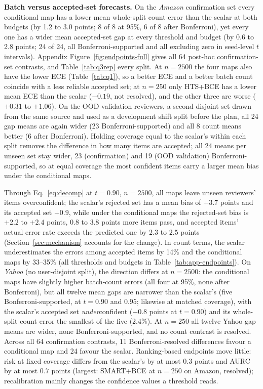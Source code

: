 \documentclass[sigconf,anonymous,review]{acmart}
\begin{document}
\textbf{Batch versus accepted-set forecasts.} On the \emph{Amazon} confirmation set every
conditional map has a lower mean whole-split count error than the scalar at
both budgets (by 1.2 to 3.0 points; 8 of 8 at 95\%, 6 of 8 after
Bonferroni), yet every one has a wider mean accepted-set gap at every
threshold and budget (by 0.6 to 2.8 points; 24 of 24, all
Bonferroni-supported and all excluding zero in seed-level $t$ intervals).
Appendix Figure~\ref{fig:endpoints-full} gives all 64 post-hoc
confirmation-set contrasts, and Table~\ref{tab:q3rep} every split.
At $n{=}2500$ the four maps also have the lower ECE (Table~\ref{tab:q1}),
so a better ECE and a better batch count coincide with a less reliable
accepted set; at $n{=}250$ only HTS+BCE has a lower mean ECE than the
scalar ($-0.19$, not resolved), and the other three are worse ($+0.31$ to
$+1.06$). On the OOD validation reviewers, a second disjoint set drawn from the
same source and used as a development shift split before the plan, all 24 gap means are again wider (23
Bonferroni-supported) and all 8 count means better (6 after Bonferroni).
Holding coverage equal to the scalar's within each split removes the
difference in how many items are accepted; all 24 means per unseen set stay
wider, 23 (confirmation) and 19 (OOD validation) Bonferroni-supported, so at
equal coverage the most confident items carry a larger mean bias under the
conditional maps.

Through Eq.~\eqref{eq:decomp} at $t{=}0.90$, $n{=}2500$, all maps leave unseen reviewers' items overconfident; the
scalar's rejected set has a mean bias of $+3.7$ points and its accepted
set $+0.9$, while under the conditional maps the rejected-set bias is
$+2.2$ to $+2.4$ points, 0.8 to 3.8 points more items pass, and accepted
items' actual error rate exceeds the predicted one by $2.3$ to $2.5$
points (Section~\ref{sec:mechanism} accounts for the change). In
count terms, the scalar underestimates the errors among accepted items by
14\% and the conditional maps by 33--35\% (all thresholds and budgets in
Table~\ref{tab:app-endpoints}). On \emph{Yahoo} (no user-disjoint split),
the direction differs at $n{=}2500$: the conditional maps have slightly
higher batch-count errors (all four at 95\%, none after Bonferroni), but all
twelve mean gaps are narrower than the scalar's (five Bonferroni-supported,
at $t{=}0.90$ and $0.95$; likewise at matched coverage), with the scalar's
accepted set \emph{under}confident ($-0.8$ points at $t{=}0.90$) and its
whole-split count error the smallest of the five (2.4\%). At $n{=}250$ all
twelve Yahoo gap means are wider, none Bonferroni-supported, and no count
contrast is resolved. Across all 64 confirmation contrasts, 11
Bonferroni-resolved differences favour a conditional map and 24 favour the
scalar. Ranking-based endpoints move little: risk at fixed coverage
differs from the scalar's by at most $0.3$ points and AURC by at most
$0.7$ points (largest: SMART+BCE at $n{=}250$ on Amazon, resolved);
recalibration mainly changes the confidence values a threshold reads.
\end{document}
